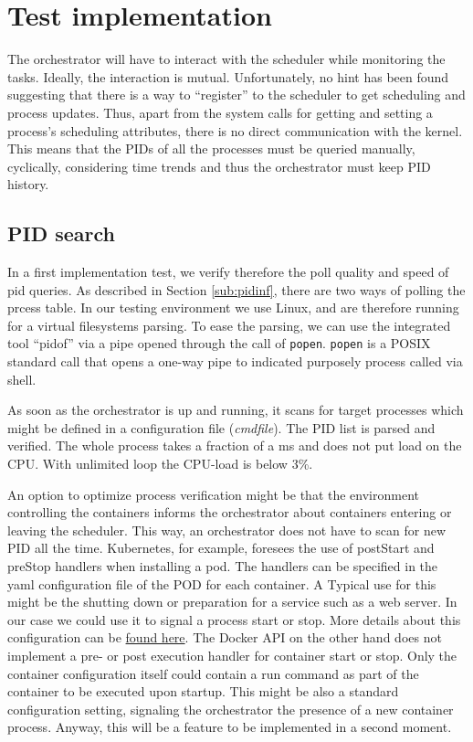 \documentclass[]{scrartcl}
\begin{document}
\section{Test implementation}
\label{sec:testimp}

The orchestrator will have to interact with the scheduler while monitoring the tasks. 
Ideally, the interaction is mutual. Unfortunately, no hint has been found suggesting that there is a way to ``register'' to the scheduler to get scheduling and process updates. 
Thus, apart from the system calls for getting and setting a process's scheduling attributes, there is no direct communication with the kernel. 
This means that the PIDs of all the processes must be queried manually, cyclically, considering time trends and thus the orchestrator must keep PID history. 

\subsection{PID search}

In a first implementation test, we verify therefore the poll quality and speed of pid queries.
As described in Section \ref{sub:pidinf}, there are two ways of polling the prcess table. 
In our testing environment we use Linux, and are therefore running for a virtual filesystems parsing. 
To ease the parsing, we can use the integrated tool ``pidof'' via a pipe opened through the call of \texttt{popen}.
\texttt{popen} is a POSIX standard call that opens a one-way pipe to indicated purposely process called via shell.

As soon as the orchestrator is up and running, it scans for target processes which might be  defined in a configuration file (\textit{cmdfile}).
The PID list is parsed and verified. 
The whole process takes a fraction of a ms and does not put load on the {CPU}. With unlimited loop the {CPU}-load is below 3\%.

An option to optimize process verification might be that the environment controlling the containers informs the orchestrator about containers entering or leaving the scheduler.
This way, an orchestrator does not have to scan for new PID all the time.
Kubernetes, for example, foresees the use of postStart and preStop handlers when installing a pod. 
The handlers can be specified in the yaml configuration file of the POD for each container. A Typical use for this might be the shutting down or preparation for a service such as a web server. 
In our case we could use it to signal a process start or stop.
More details about this configuration can be \href{{https://kubernetes.io/docs/tasks/configure-pod-container/attach-handler-lifecycle-event/}}{found here}.
The Docker API on the other hand does not implement a pre- or post execution handler for container start or stop. 
Only the container configuration itself could contain a run command as part of the container to be executed upon startup. This might be also a standard configuration setting, signaling the orchestrator the presence of a new container process.
Anyway, this will be a feature to be implemented in a second moment.
\end{document}
